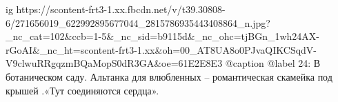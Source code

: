  
 
 
 
 

\ifcmt
  ig https://scontent-frt3-1.xx.fbcdn.net/v/t39.30808-6/271656019_622992895677044_2815786935443408864_n.jpg?_nc_cat=102&ccb=1-5&_nc_sid=b9115d&_nc_ohc=tjBGn_1wh24AX-rGoAI&_nc_ht=scontent-frt3-1.xx&oh=00_AT8UA8o0PJvaQIKCSqdV-V9clwuRRgqzmBQaMopS0dR3GA&oe=61E2E8E3
  @caption @label 24: В ботаническом саду. Альтанка для влюбленных – романтическая скамейка под крышей .«Тут соединяются сердца».
\fi
